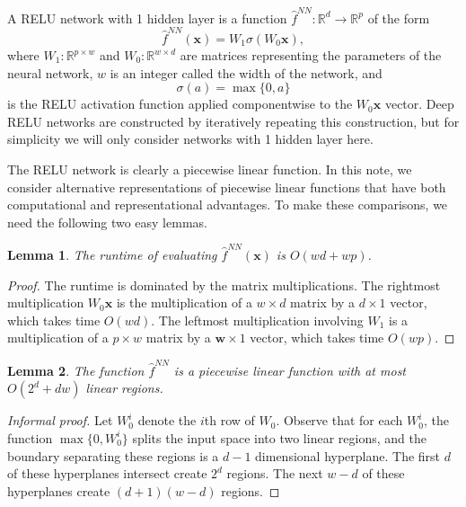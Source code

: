 \documentclass{article}
\newtheorem{lemma}{Lemma}
\newcommand{\R}{\mathbb{R}}
\newcommand{\w}{\mathbf w}
\newcommand{\wnn}{W}
\newcommand{\x}{\mathbf{x}}
\newcommand{\f}{f}
\newcommand{\fhat}{{\hat\f}}
\newcommand{\fnn}{{\fhat^\textit{NN}}}
\begin{document}
A RELU network with 1 hidden layer is a function $\fnn : \R^d \to \R^p$ of the form
\begin{equation}
    \fnn(\x) = \wnn_1\sigma(\wnn_0\x), 
    \label{eq:nn}
\end{equation}
where $\wnn_1 : \R^{p\times w}$ and $\wnn_0 : \R^{w\times d}$ are matrices representing the parameters of the neural network,
$w$ is an integer called the width of the network,
and
\begin{equation}
    \sigma(a) = \max\{0,a\}
\end{equation}
is the RELU activation function applied componentwise to the $\wnn_0\x$ vector.
Deep RELU networks are constructed by iteratively repeating this construction,
but for simplicity we will only consider networks with 1 hidden layer here.

The RELU network is clearly a piecewise linear function.
In this note, we consider alternative representations of piecewise linear functions that have both computational and representational advantages.
To make these comparisons, we need the following two easy lemmas.


\begin{lemma}
The runtime of evaluating $\fnn(\x)$ is $O(wd+wp)$.
\label{lem:nn:time}
\end{lemma}
\begin{proof}
The runtime is dominated by the matrix multiplications.
The rightmost multiplication $\wnn_0\x$ is the multiplication of a $w\times d$ matrix by a $d\times1$ vector, which takes time $O(wd)$.
The leftmost multiplication involving $\wnn_1$ is a multiplication of a $p\times w$ matrix by a $\w\times1$ vector, which takes time $O(wp)$.
\end{proof}


\begin{lemma}
The function $\fnn$ is a piecewise linear function with at most $O(2^d+dw)$ linear regions.
\label{lem:nn:pieces}
\end{lemma}
\begin{proof}[Informal proof]
Let $\wnn_0^i$ denote the $i$th row of $\wnn_0$.
Observe that for each $\wnn_0^i$, 
the function $\max\{0,\wnn_0^i\}$ splits the input space into two linear regions,
and the boundary separating these regions is a $d-1$ dimensional hyperplane.
The first $d$ of these hyperplanes intersect create $2^d$ regions.
The next $w-d$ of these hyperplanes create $(d+1)(w-d)$ regions.
\end{proof}
\end{document}
